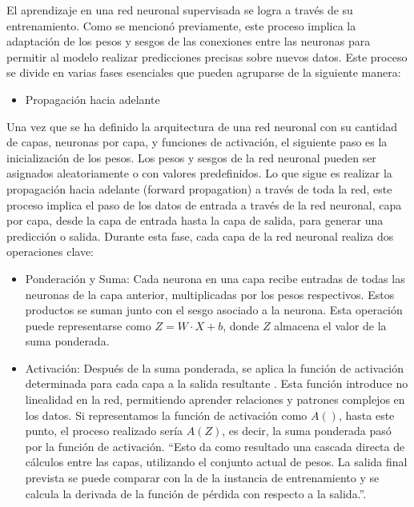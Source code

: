 El aprendizaje en una red neuronal supervisada se logra a través de su entrenamiento. Como se mencionó previamente, este proceso implica la adaptación de los pesos y sesgos de las conexiones entre las neuronas para permitir al modelo realizar predicciones precisas sobre nuevos datos. Este proceso se divide en varias fases esenciales que pueden agruparse de la siguiente manera:

\begin{itemize}
\item Propagación hacia adelante
\end{itemize}


Una vez que se ha definido la arquitectura de una red neuronal con su cantidad de capas, neuronas por capa, y funciones de activación, el siguiente paso es la inicialización de los pesos. Los pesos y sesgos de la red neuronal pueden ser asignados aleatoriamente o con valores predefinidos.
Lo que sigue es realizar la propagación hacia adelante (forward propagation) a través de toda la red, este proceso implica el paso de los datos de entrada a través de la red neuronal, capa por capa, desde la capa de entrada hasta la capa de salida, para generar una predicción o salida. Durante esta fase, cada capa de la red neuronal realiza dos operaciones clave:

\begin{itemize}
	\item Ponderación y Suma: Cada neurona en una capa recibe entradas de todas las neuronas de la capa anterior, multiplicadas por los pesos respectivos. Estos productos se suman junto con el sesgo asociado a la neurona. Esta operación puede representarse como $Z=W\cdot X+b$, donde $Z$ almacena el valor de la suma ponderada.
	\item Activación: Después de la suma ponderada, se aplica la función de activación determinada para cada capa a la salida resultante . Esta función introduce no linealidad en la red, permitiendo aprender relaciones y patrones complejos en los datos. Si representamos la función de activación como $A()$, hasta este punto, el proceso realizado sería $A(Z)$, es decir, la suma ponderada pasó por la función de activación. ``Esto da como resultado una cascada directa de cálculos entre las capas, utilizando el conjunto actual de pesos. La salida final prevista se puede comparar con la de la instancia de entrenamiento y se calcula la derivada de la función de pérdida con respecto a la salida.''\cite[p.22]{aggarwal2018neural}.
\end{itemize}

